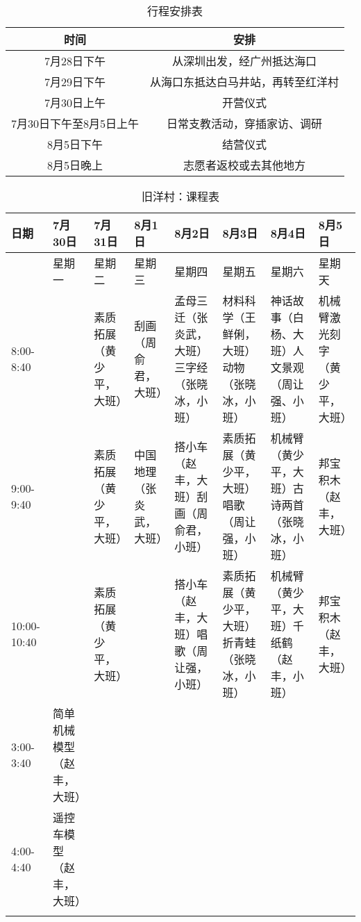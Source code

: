 \documentclass[12pt]{ctexart}
\def\CurriculumScheduleWidth{1.6cm}
\begin{document}
\begin{table}[!ht]
\centering
\begin{tabular}{|c|c|}
\hline
时间 & 安排 \\
\hline
7月28日下午 &  从深圳出发，经广州抵达海口 \\
\hline
7月29日下午 & 从海口东抵达白马井站，再转至红洋村 \\
\hline
7月30日上午 & 开营仪式\\
\hline
7月30日下午至8月5日上午 & 日常支教活动，穿插家访、调研 \\
\hline
8月5日下午 & 结营仪式 \\
\hline
8月5日晚上 & 志愿者返校或去其他地方 \\
\hline
\end{tabular}
\caption{行程安排表}\label{route}
\end{table}

\begin{longtable}{|p{\CurriculumScheduleWidth}|p{\CurriculumScheduleWidth}|p{\CurriculumScheduleWidth}|p{\CurriculumScheduleWidth}|p{\CurriculumScheduleWidth}|p{\CurriculumScheduleWidth}|p{\CurriculumScheduleWidth}|p{\CurriculumScheduleWidth}|}
\hline
日期 & 7月30日 & 7月31日 & 8月1日 & 8月2日 & 8月3日 & 8月4日 & 8月5日 \\
\hline
& 星期一 & 星期二 & 星期三 & 星期四 & 星期五 & 星期六 & 星期天 \\
\hline
8:00-8:40  &  & 素质拓展（黄少平，大班）& 刮画（周俞君，大班）  & 孟母三迁（张炎武，大班）三字经（张晓冰，小班） & 材料科学（王鲜俐，大班）动物（张晓冰，小班）& 神话故事（白杨、大班）人文景观（周让强、小班） & 机械臂激光刻字（黄少平，大班）  \\
\hline
9:00-9:40 & &  素质拓展（黄少平，大班）& 中国地理（张炎武，大班） & 搭小车（赵丰，大班）刮画（周俞君，小班）  & 素质拓展（黄少平，大班）唱歌（周让强，小班） & 机械臂（黄少平，大班）古诗两首（张晓冰，小班） & 邦宝积木（赵丰，大班） \\
\hline
10:00-10:40 &  &  素质拓展（黄少平，大班） & &  搭小车（赵丰，大班）唱歌（周让强，小班）  &  素质拓展（黄少平，大班）折青蛙（张晓冰，小班）& 机械臂（黄少平，大班）千纸鹤（赵丰，小班）&    邦宝积木（赵丰，大班） \\
\hline
3:00-3:40  & 简单机械模型（赵丰，大班） &  &  &  &  &  & \\
\hline
4:00-4:40  & 遥控车模型（赵丰，大班） & &  &  &  & &  \\
\hline
\caption{旧洋村：课程表}\label{curriculum_schedule}
\end{longtable}
\end{document}
